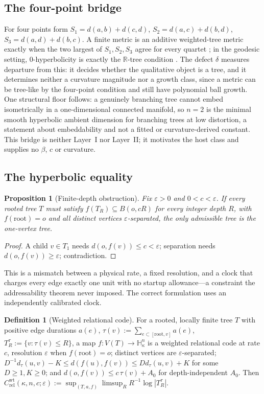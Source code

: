 \documentclass[11pt,reqno]{amsart}
\theoremstyle{plain}
\newtheorem{proposition}[theorem]{Proposition}
\theoremstyle{definition}
\newtheorem{definition}[theorem]{Definition}
\newcommand{\Crel}{C_{\mathrm{rel}}}
\newcommand{\Hk}{\mathbb{H}^n_\kappa}
\newcommand{\eps}{\varepsilon}
\begin{document}
\subsection{The four-point bridge}\label{sec:classifier}
For four points form $S_1=d(a,b)+d(c,d)$, $S_2=d(a,c)+d(b,d)$, $S_3=d(a,d)+d(b,c)$. A finite metric is an additive weighted-tree metric exactly when the two largest of $S_1,S_2,S_3$ agree for every quartet \cite{buneman1971}; in the geodesic setting, $0$-hyperbolicity is exactly the $\mathbb R$-tree condition \cite{gromov1987}. The defect $\delta$ measures departure from this: it decides whether the qualitative object is a tree, and it determines neither a curvature magnitude nor a growth class, since a metric can be tree-like by the four-point condition and still have polynomial ball growth. One structural floor follows: a genuinely branching tree cannot embed isometrically in a one-dimensional connected manifold, so $n=2$ is the minimal smooth hyperbolic ambient dimension for branching trees at low distortion, a statement about embeddability and not a fitted or curvature-derived constant. This bridge is neither Layer~I nor Layer~II; it motivates the host class and supplies no $\beta$, $c$ or curvature.

\subsection{The hyperbolic equality}

\begin{proposition}[Finite-depth obstruction]\label{prop:finitedepth}
Fix $\eps>0$ and $0<c<\eps$. If every rooted tree $T$ must satisfy $f(T_R)\subseteq B(o,cR)$ for every integer depth $R$, with $f(\mathrm{root})=o$ and all distinct vertices $\eps$-separated, the only admissible tree is the one-vertex tree.
\end{proposition}

\begin{proof}
A child $v\in T_1$ needs $d(o,f(v))\le c<\eps$; separation needs $d(o,f(v))\ge\eps$; contradiction.
\end{proof}

This is a mismatch between a physical rate, a fixed resolution, and a clock that charges every edge exactly one unit with no startup allowance---a constraint the addressability theorem never imposed. The correct formulation uses an independently calibrated clock.

\begin{definition}[Weighted relational code]
For a rooted, locally finite tree $T$ with positive edge durations $a(e)$, $\tau(v):=\sum_{e\subset[\mathrm{root},v]}a(e)$, $T_R^\tau:=\{v:\tau(v)\le R\}$, a map $f:V(T)\to\Hk$ is a weighted relational code at rate $c$, resolution $\eps$ when $f(\mathrm{root})=o$; distinct vertices are $\eps$-separated; $D^{-1}d_\tau(u,v)-K\le d(f(u),f(v))\le Dd_\tau(u,v)+K$ for some $D\ge1,K\ge0$; and $d(o,f(v))\le c\,\tau(v)+A_0$ for depth-independent $A_0$. Then $\Crel^{\mathrm{wt}}(\kappa,n,c;\eps):=\sup_{(T,a,f)}\limsup_R R^{-1}\log|T_R^\tau|$.
\end{definition}
\end{document}
